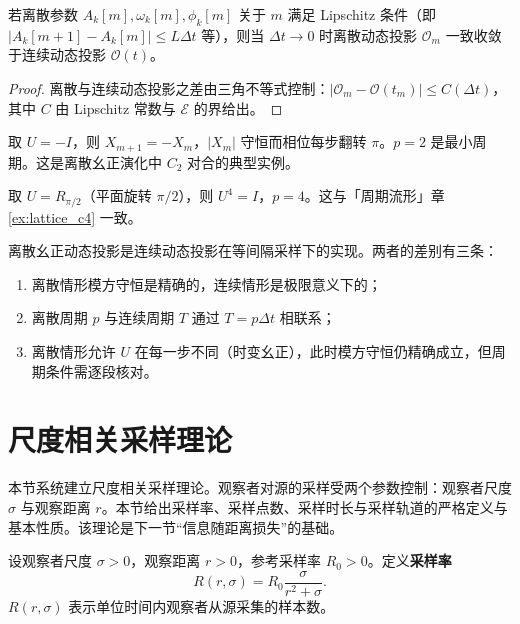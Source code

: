 \begin{proposition}[离散动态投影的连续性条件]\label{prop:dyn_discrete_projection_continuity}
若离散参数 $A_k[m],\omega_k[m],\phi_k[m]$ 关于 $m$ 满足 Lipschitz 条件（即 $|A_k[m+1]-A_k[m]|\le L\Delta t$ 等），则当 $\Delta t\to 0$ 时离散动态投影 $\mathcal O_m$ 一致收敛于连续动态投影 $\mathcal O(t)$。
\end{proposition}

\begin{proof}
离散与连续动态投影之差由三角不等式控制：$|\mathcal O_m-\mathcal O(t_m)|\le C(\Delta t)$，其中 $C$ 由 Lipschitz 常数与 $\mathcal E$ 的界给出。
\end{proof}

\begin{example}[二阶周期振荡]\label{ex:dyn_discrete_c2}
取 $U=-I$，则 $X_{m+1}=-X_m$，$|X_m|$ 守恒而相位每步翻转 $\pi$。$p=2$ 是最小周期。这是离散幺正演化中 $C_2$ 对合的典型实例。
\end{example}

\begin{example}[$C_4$ 周期旋转]\label{ex:dyn_discrete_c4}
取 $U=R_{\pi/2}$（平面旋转 $\pi/2$），则 $U^4=I$，$p=4$。这与「周期流形」章 \cref{ex:lattice_c4} 一致。
\end{example}

\begin{remark}[离散幺正与连续动态的关系]\label{rem:dyn_discrete_vs_continuous}
离散幺正动态投影是连续动态投影在等间隔采样下的实现。两者的差别有三条：
\begin{enumerate}[label=(\roman*)]
    \item 离散情形模方守恒是精确的，连续情形是极限意义下的；
    \item 离散周期 $p$ 与连续周期 $T$ 通过 $T=p\Delta t$ 相联系；
    \item 离散情形允许 $U$ 在每一步不同（时变幺正），此时模方守恒仍精确成立，但周期条件需逐段核对。
\end{enumerate}
\end{remark}

\section{尺度相关采样理论}
\label{sec:dyn_sampling}

本节系统建立尺度相关采样理论。观察者对源的采样受两个参数控制：观察者尺度 $\sigma$ 与观察距离 $r$。本节给出采样率、采样点数、采样时长与采样轨道的严格定义与基本性质。该理论是下一节“信息随距离损失”的基础。

\begin{definition}[尺度相关采样率]\label{def:dyn_sampling_rate}
设观察者尺度 $\sigma>0$，观察距离 $r>0$，参考采样率 $R_0>0$。定义\textbf{采样率}
\[
R(r,\sigma)=R_0\frac{\sigma}{r^2+\sigma}.
\]
$R(r,\sigma)$ 表示单位时间内观察者从源采集的样本数。
\end{definition}

